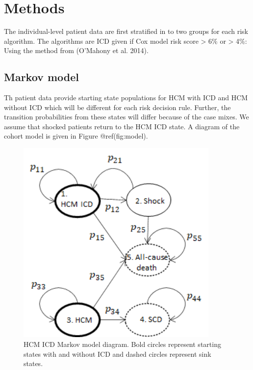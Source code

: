 \documentclass[
]{article}
\begin{document}
\hypertarget{methods}{%
\section{Methods}\label{methods}}

The individual-level patient data are first stratified in to two groups
for each risk algorithm. The algorithms are ICD given if Cox model risk
score \textgreater{} 6\% or \textgreater{} 4\%: Using the method from
(O'Mahony et al. 2014).

\hypertarget{markov-model}{%
\subsection{Markov model}\label{markov-model}}

Th patient data provide starting state populations for HCM with ICD and
HCM without ICD which will be different for each risk decision rule.
Further, the transition probabilities from these states will differ
because of the case mixes. We assume that shocked patients return to the
HCM ICD state. A diagram of the cohort model is given in Figure
@ref(fig:model).

\begin{figure}

{\centering \includegraphics[width=3.93in]{../../images/model_diagram} 

}

\caption{HCM ICD Markov model diagram. Bold circles represent starting states with and without ICD and dashed circles represent sink states.}\label{fig:model}
\end{figure}
\end{document}
